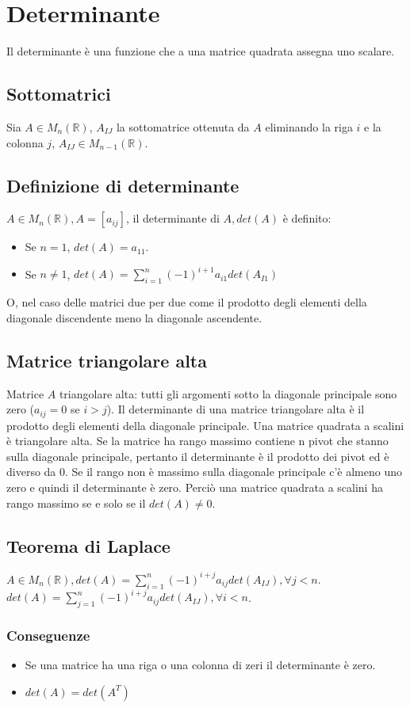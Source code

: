 \chapter{Determinante}
Il determinante \`e una funzione che a una matrice quadrata assegna uno scalare.
\section{Sottomatrici}
Sia $A\in M_n(\mathbb{R})$, $A_{IJ}$ la sottomatrice ottenuta da $A$ eliminando la riga $i$ e la colonna $j$, $A_{IJ}\in M_{n-1}(\mathbb{R})$.
\section{Definizione di determinante}
$A\in M_n(\mathbb{R}), A=[a_{ij}]$, il determinante di $A, det(A)$ \`e definito:
\begin{itemize}
\item Se $n=1$, $det(A)=a_{11}$.
\item Se $n\neq 1$, $det(A)=\sum\limits_{i=1}^n(-1)^{i+1}a_{i1}det(A_{I1})$
\end{itemize}
O, nel caso delle matrici due per due come il prodotto degli elementi della diagonale discendente meno la diagonale ascendente. 
\section{Matrice triangolare alta}
Matrice $A$ triangolare alta: tutti gli argomenti sotto la diagonale principale sono zero ($a_{ij}=0$ se $i>j$). Il determinante di una matrice triangolare alta \`e il 
prodotto degli elementi della diagonale principale. Una matrice quadrata a scalini \`e triangolare alta. Se la matrice ha rango massimo contiene n pivot che stanno sulla 
diagonale principale, pertanto il determinante \`e il prodotto dei pivot ed \`e diverso da 0. Se il rango non \`e massimo sulla diagonale principale c'\`e almeno uno zero
e quindi il determinante \`e zero. Perci\`o una matrice quadrata a scalini ha rango massimo se e solo se il $det(A)\neq 0$. 
\section{Teorema di Laplace}
$A\in M_n(\mathbb{R}),det(A)=\sum\limits_{i=1}^n(-1)^{i+j}a_{ij}det(A_{IJ}),\forall j<n$.\\
$det(A)=\sum\limits_{j=1}^n(-1)^{i+j}a_{ij}det(A_{IJ}),\forall i<n$.
\subsection{Conseguenze}
\begin{itemize}
\item Se una matrice ha una riga o una colonna di zeri il determinante \`e zero.
\item $det(A)=det(A^T)$
\end{itemize}

